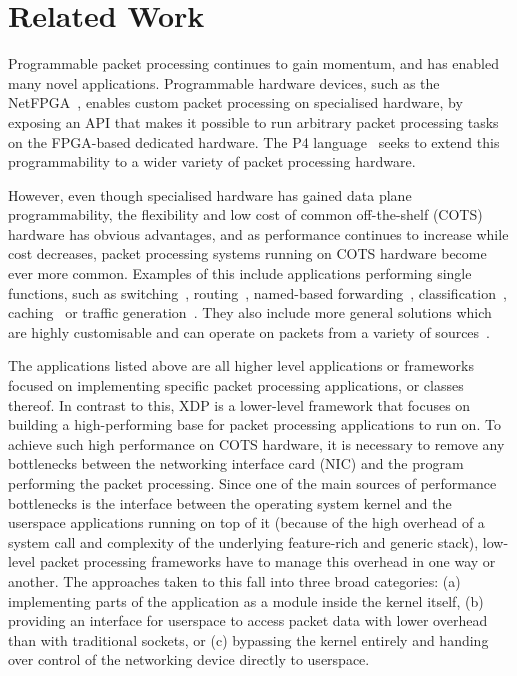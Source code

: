 \documentclass[sigconf]{acmart}
\begin{document}
\section{Related Work}%
\label{sec:related-work}

Programmable packet processing continues to gain momentum, and has enabled many
novel applications. Programmable hardware devices, such as the
NetFPGA~\cite{lockwood2007netfpga}, enables custom packet processing on
specialised hardware, by exposing an API that makes it possible to run arbitrary
packet processing tasks on the FPGA-based dedicated hardware. The P4
language~\cite{bosshart2014p4} seeks to extend this programmability to a wider
variety of packet processing hardware.

However, even though specialised hardware has gained data plane programmability,
the flexibility and low cost of common off-the-shelf (COTS) hardware has obvious
advantages, and as performance continues to increase while cost decreases,
packet processing systems running on COTS hardware become ever more common.
Examples of this include applications performing single functions, such as
switching~\cite{rizzo2012vale}, routing~\cite{han2010packetshader}, named-based
forwarding~\cite{kirchner2016augustus}, classification~\cite{santiago2012wire},
caching~\cite{mansilha2015hierarchical} or traffic
generation~\cite{emmerich2015moongen}. They also include more general solutions
which are highly customisable and can operate on packets from a variety of
sources~\cite{han2012megapipe,marian2012netslices,linguaglossa2017high,morris1999click,dobrescu2009routebricks,openvswitch}.

The applications listed above are all higher level applications or frameworks
focused on implementing specific packet processing applications, or classes
thereof. In contrast to this, XDP is a lower-level framework that focuses on
building a high-performing base for packet processing applications to run on. To
achieve such high performance on COTS hardware, it is necessary to remove any
bottlenecks between the networking interface card (NIC) and the program
performing the packet processing. Since one of the main sources of performance
bottlenecks is the interface between the operating system kernel and the
userspace applications running on top of it (because of the high overhead of a
system call and complexity of the underlying feature-rich and generic stack),
low-level packet processing frameworks have to manage this overhead in one way
or another. The approaches taken to this fall into three broad categories:
(a) implementing parts of the application as a module inside the kernel itself,
(b) providing an interface for userspace to access packet data with lower
overhead than with traditional sockets, or (c) bypassing the kernel entirely
and handing over control of the networking device directly to userspace.
\end{document}
